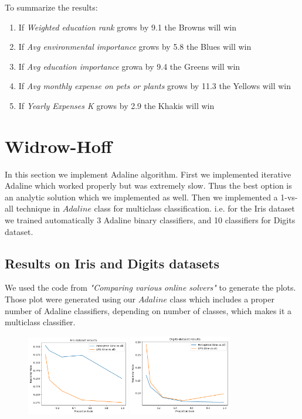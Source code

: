 \documentclass[12pt]{article}
\begin{document}
To summarize the results:

\begin{enumerate}

\item If \textit{Weighted education rank} grows by 9.1 the Browns will win

\item If \textit{Avg environmental importance} grows by 5.8 the Blues will win

\item If \textit{Avg education importance} growa by 9.4 the  Greens will win

\item If \textit{Avg monthly expense on pets or plants} grows by 11.3 the Yellows will win

\item If \textit{Yearly Expenses K} grows by 2.9 the Khakis will win

\end{enumerate}

\newpage
\section{Widrow-Hoff}
In this section we implement Adaline algorithm. First we implemented iterative Adaline which worked properly but was extremely slow. Thus the best option is an analytic solution which we implemented as well. Then we implemented a 1-vs-all technique in $Adaline$ class for multiclass classification. i.e. for the Iris dataset we trained automatically 3 Adaline binary classifiers, and 10 classifiers for Digits dataset.
\subsection{Results on Iris and Digits datasets}
We used the code from \textit{"Comparing various online solvers"} to generate the plots. Those plot were generated using our $Adaline$ class which includes a proper number of Adaline classifiers, depending on number of classes, which makes it a multiclass classifier. 
\begin{figure}[ht]
	\centering
	\includegraphics[width=0.4\textwidth]{weirdo_hoff_plots/iris}
	\includegraphics[width=0.4\textwidth]{weirdo_hoff_plots/digits}			
\end{figure}
\end{document}
